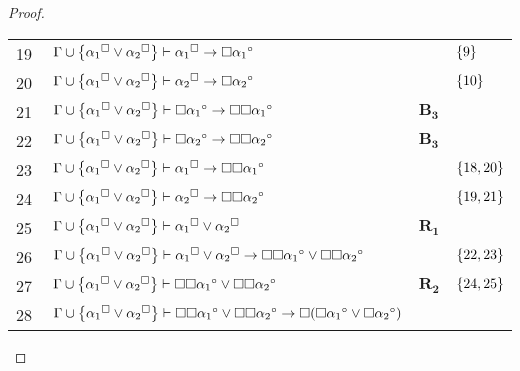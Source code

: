 \begin{tcolorbox}[enhanced jigsaw, breakable, sharp corners, colframe=black, colback=white, boxrule=0.5pt, left=1.5mm, right=1.5mm, top=1.5mm, bottom=1.5mm]
\begin{theorem}
\begin{proof}
\begin{xltabular}{\textwidth}{r | X l l}
            \scriptsize{19}\phantom{ } & $\ \Gamma \cup \left\{{\alpha_1}^\Box \vee {\alpha_2}^\Box\right\} \vdash {\alpha_1}^\Box \to \Box{\alpha_1}^\circ$ &  & $\left\{9\right\}$\\[\rowskip]
            \scriptsize{20}\phantom{ } & $\ \Gamma \cup \left\{{\alpha_1}^\Box \vee {\alpha_2}^\Box\right\} \vdash {\alpha_2}^\Box \to \Box{\alpha_2}^\circ$ &  & $\left\{10\right\}$\\[\rowskip]
            \scriptsize{21}\phantom{ } & $\ \Gamma \cup \left\{{\alpha_1}^\Box \vee {\alpha_2}^\Box\right\} \vdash \Box{\alpha_1}^\circ \to \Box\Box{\alpha_1}^\circ$ & $\hyperref[modal.axiom.modal.3]{\mathbf{B_3}}$ & \\[\rowskip]
            \scriptsize{22}\phantom{ } & $\ \Gamma \cup \left\{{\alpha_1}^\Box \vee {\alpha_2}^\Box\right\} \vdash \Box{\alpha_2}^\circ \to \Box\Box{\alpha_2}^\circ$ & $\hyperref[modal.axiom.modal.3]{\mathbf{B_3}}$ & \\[\rowskip]
            \scriptsize{23}\phantom{ } & $\ \Gamma \cup \left\{{\alpha_1}^\Box \vee {\alpha_2}^\Box\right\} \vdash {\alpha_1}^\Box \to \Box\Box{\alpha_1}^\circ$ &  & $\left\{18,20\right\}$\\[\rowskip]
            \scriptsize{24}\phantom{ } & $\ \Gamma \cup \left\{{\alpha_1}^\Box \vee {\alpha_2}^\Box\right\} \vdash {\alpha_2}^\Box \to \Box\Box{\alpha_2}^\circ$ &  & $\left\{19,21\right\}$\\[\rowskip]
            \scriptsize{25}\phantom{ } & $\ \Gamma \cup \left\{{\alpha_1}^\Box \vee {\alpha_2}^\Box\right\} \vdash {\alpha_1}^\Box \vee {\alpha_2}^\Box$ & $\hyperref[modal.rule.1]{\mathbf{R_1}}$ & \\[\rowskip]
            \scriptsize{26}\phantom{ } & $\ \Gamma \cup \left\{{\alpha_1}^\Box \vee {\alpha_2}^\Box\right\} \vdash {\alpha_1}^\Box \vee {\alpha_2}^\Box \to \Box\Box{\alpha_1}^\circ \vee \Box\Box{\alpha_2}^\circ$ &  & $\left\{22,23\right\}$\\[\rowskip]
            \scriptsize{27}\phantom{ } & $\ \Gamma \cup \left\{{\alpha_1}^\Box \vee {\alpha_2}^\Box\right\} \vdash \Box\Box{\alpha_1}^\circ \vee \Box\Box{\alpha_2}^\circ$ & $\hyperref[modal.rule.2]{\mathbf{R_2}}$ & $\left\{24,25\right\}$\\[\rowskip]
            \scriptsize{28}\phantom{ } & $\ \Gamma \cup \left\{{\alpha_1}^\Box \vee {\alpha_2}^\Box\right\} \vdash \Box\Box{\alpha_1}^\circ \vee \Box\Box{\alpha_2}^\circ \to \Box(\Box{\alpha_1}^\circ \vee \Box{\alpha_2}^\circ)$ &  & \\[\rowskip]

\end{xltabular}
\end{proof}
\end{theorem}
\end{tcolorbox}

